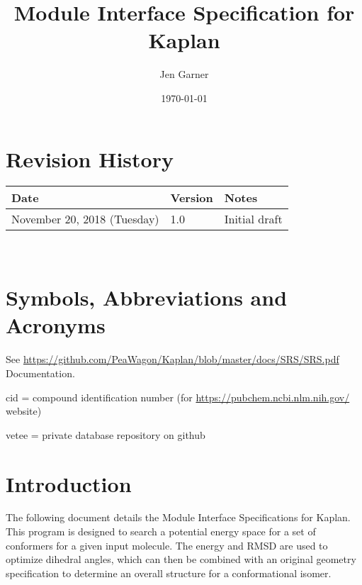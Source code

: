 \documentclass[12pt, titlepage]{article}
\newcommand{\progname}{Kaplan}
\begin{document}
\title{Module Interface Specification for \progname{}}

\author{Jen Garner}

\date{\today}

\maketitle


\section{Revision History}

\begin{tabularx}{\textwidth}{p{3cm}p{2cm}X}
\toprule {\bf Date} & {\bf Version} & {\bf Notes}\\
\midrule
November 20, 2018 (Tuesday) & 1.0 & Initial draft \\
\bottomrule
\end{tabularx}

~\newpage

\section{Symbols, Abbreviations and Acronyms}

See \href{SRS}{https://github.com/PeaWagon/Kaplan/blob/master/docs/SRS/SRS.pdf} 
Documentation.

cid = compound identification number (for 
\href{pubchem}{https://pubchem.ncbi.nlm.nih.gov/} website)

vetee = private database repository on github

\newpage

\tableofcontents

\newpage


\section{Introduction}

The following document details the Module Interface Specifications for 
\progname{}. This program is designed to search a potential energy space for a 
set of conformers for a given input molecule. The energy and RMSD are used to 
optimize dihedral angles, which can then be combined with an original geometry 
specification to determine an overall structure for a conformational isomer.
\end{document}
